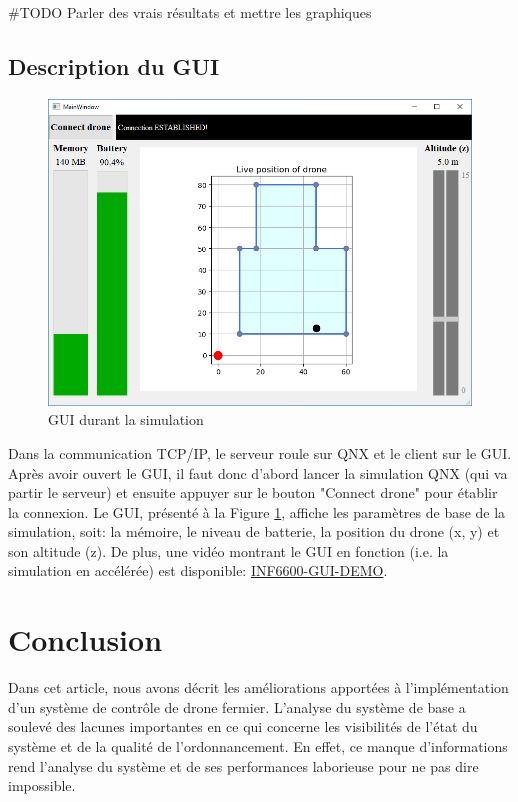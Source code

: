 \documentclass[journal]{IEEEtran}
\begin{document}
\#TODO Parler des vrais résultats et mettre les graphiques


\subsection{Description du GUI}
\begin{figure}
	\centering
	\captionsetup{justification=centering}
	\includegraphics[width=\linewidth]{GUI_image.png}
	\caption{GUI durant la simulation}
	\label{fig:GUI}
\end{figure}

Dans la communication TCP/IP, le serveur roule sur QNX et le client sur le GUI. Après avoir ouvert le GUI, il faut donc d'abord lancer la simulation QNX (qui va partir le serveur) et ensuite appuyer sur le bouton "Connect drone" pour établir la connexion. Le GUI, présenté à la Figure \ref{fig:GUI}, affiche les paramètres de base de la simulation, soit: la mémoire, le niveau de batterie, la position du drone (x, y) et son altitude (z). De plus, une vidéo montrant le GUI en fonction (i.e. la simulation en accélérée) est disponible: \href{https://drive.google.com/file/d/1W9yt0Z4YxCwr0TjXkgv12WVO9TSmWGtv/view?usp=sharing}{{\color{blue}INF6600-GUI-DEMO}}\cite{ref:video}.

\section{Conclusion}
Dans cet article, nous avons décrit les améliorations apportées à l'implémentation d'un système de contrôle de drone fermier. L'analyse du système de base a soulevé des lacunes importantes en ce qui concerne les visibilités de l'état du système et de la qualité de l'ordonnancement. En effet, ce manque d'informations rend l'analyse du système et de ses performances laborieuse pour ne pas dire impossible. 
\end{document}
